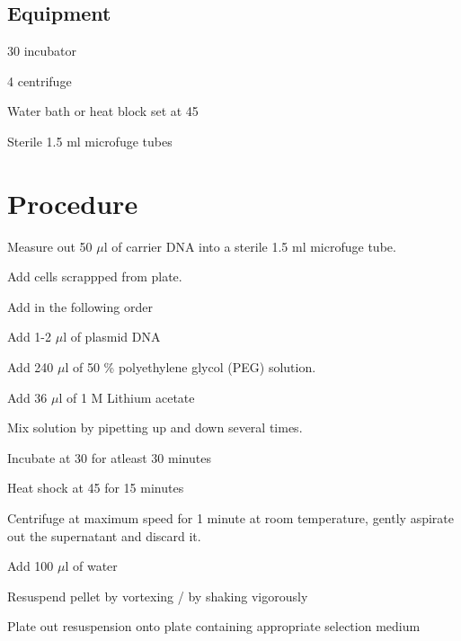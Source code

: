 \documentclass[a4paper,12pt]{article}
\newenvironment{packed_enum}{
\begin{enumerate}
  \setlength{\itemsep}{1pt}
  \setlength{\parskip}{0pt}
  \setlength{\parsep}{0pt}
}{\end{enumerate}}
\begin{document}
	\subsection{Equipment}
			\begin{packed_enum}
				\item 30 {\textcelsius} incubator
				\item 4 {\textcelsius} centrifuge
				\item Water bath or heat block set at 45 \textcelsius
				\item Sterile 1.5 ml microfuge tubes
			\end{packed_enum}
 
		
\section{Procedure}
	\begin{packed_enum}
		\item Measure out 50 $\mu$l of carrier DNA into a sterile 1.5 ml microfuge tube.
		\item Add cells scrappped from plate.
		\item Add in the following order
		\begin{packed_enum}
		\item Add 1-2 $\mu$l of plasmid DNA
		\item Add 240 $\mu$l of 50 \% polyethylene glycol (PEG) solution.
		\item Add 36 $\mu$l of 1 M Lithium acetate 
		\end{packed_enum}
		\item Mix solution by  pipetting up and down several times.
		\item Incubate at 30 {\textcelsius} for atleast 30 minutes
		\item Heat shock at 45 {\textcelsius} for 15 minutes
		\item Centrifuge at maximum speed for 1 minute at room temperature, gently aspirate out the supernatant and discard it.
		\item Add 100 $\mu$l of water
		\begin{packed_enum}
		\item Resuspend pellet by vortexing / by shaking vigorously
		\item Plate out resuspension onto plate containing appropriate selection medium
		\end{packed_enum}
	\end{packed_enum}
\end{document}
